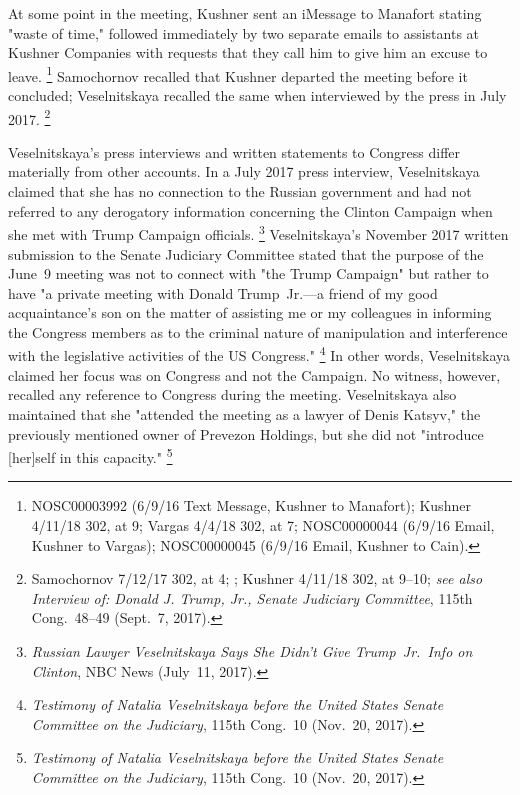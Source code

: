 At some point in the meeting, Kushner sent an iMessage to Manafort stating "waste of time," followed immediately by two separate emails to assistants at Kushner Companies with requests that they call him to give him an excuse to leave.%
\footnote{NOSC00003992 (6/9/16 Text Message, Kushner to Manafort);
Kushner 4/11/18 302, at 9;
Vargas 4/4/18 302, at 7;
NOSC00000044 (6/9/16 Email, Kushner to Vargas);
NOSC00000045 (6/9/16 Email, Kushner to Cain).}
Samochornov recalled that Kushner departed the meeting before it concluded; Veselnitskaya recalled the same when interviewed by the press in July 2017.%
\footnote{Samochornov 7/12/17 302, at 4;
;
Kushner 4/11/18 302, at 9--10;
\textit{see also Interview of: Donald J. Trump, Jr., Senate Judiciary Committee}, 115th Cong.~48--49 (Sept.~7, 2017).}

Veselnitskaya's press interviews and written statements to Congress differ materially from other accounts.
In a July 2017 press interview, Veselnitskaya claimed that she has no connection to the Russian government and had not referred to any derogatory information concerning the Clinton Campaign when she met with Trump Campaign officials.%
\footnote{\textit{Russian Lawyer Veselnitskaya Says She Didn't Give Trump~Jr.\ Info on Clinton}, NBC News (July~11, 2017).}
Veselnitskaya's November 2017 written submission to the Senate Judiciary Committee stated that the purpose of the June~9 meeting was not to connect with "the Trump Campaign" but rather to have "a private meeting with Donald Trump~Jr.---a friend of my good acquaintance's son on the matter of assisting me or my colleagues in informing the Congress members as to the criminal nature of manipulation and interference with the legislative activities of the US Congress."%
\footnote{\textit{Testimony of Natalia Veselnitskaya before the United States Senate Committee on the Judiciary}, 115th Cong.~10 (Nov.~20, 2017).}
In other words, Veselnitskaya claimed her focus was on Congress and not the Campaign.
No witness, however, recalled any reference to Congress during the meeting.
Veselnitskaya also maintained that she "attended the meeting as a lawyer of Denis Katsyv," the previously mentioned owner of Prevezon Holdings, but she did not "introduce [her]self in this capacity."%
\footnote{\textit{Testimony of Natalia Veselnitskaya before the United States Senate Committee on the Judiciary}, 115th Cong.~10 (Nov.~20, 2017).}

